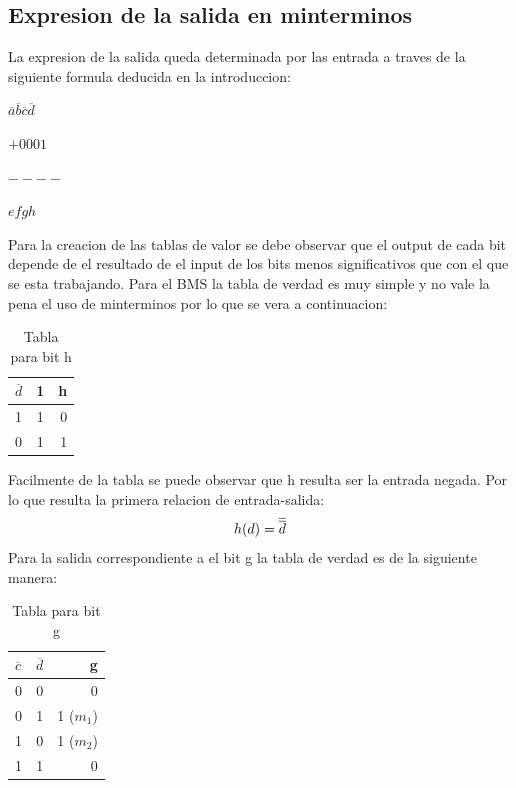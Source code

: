 \documentclass{article}
\begin{document}
	\subsection{Expresion de la salida en minterminos}
		\hspace{10mm} La expresion de la salida queda determinada por las entrada a traves de la siguiente formula deducida en la introduccion:
		\newline \centerline{$\overline{a} \overline{b} \overline{c} \overline{d}$}
		\newline \centerline{$+0001$}
		\newline \centerline{$----$}
		\newline \centerline{$efgh$}	
		\newline \hspace{10mm} Para la creacion de las tablas de valor se debe observar que el output de cada bit depende de el resultado de el input de los bits menos significativos que con el que se esta trabajando.
		\newline Para el BMS la tabla de verdad es muy simple y no vale la pena el uso de minterminos por lo que se vera a continuacion:
		\begin{table}[h!]
			\begin{center}
				\caption{Tabla para bit h}
				\begin{tabular}{l|c|r}
				\textbf{$\overline{d}$} & \textbf{1} & \textbf{h}\\
				\hline
				1 & 1 & 0 \\
				0 & 1 & 1 \\			
				\end{tabular}
			\end{center}
		\end{table}
		\newline Facilmente de la tabla se puede observar que h resulta ser la entrada negada. Por lo que resulta la primera relacion de entrada-salida:
		\begin{equation}
			\centerline{$h(d)=\overline{\overline{d}}$}
		\end{equation}
		\newline Para la salida correspondiente a el bit g la tabla de verdad es de la siguiente manera:
		\begin{table}[h!]
			\begin{center}
				\caption{Tabla para bit g}
				\begin{tabular}{l|c|r}
				\textbf{$\overline{c}$} & \textbf{$\overline{d}$} & \textbf{g}\\
				\hline
				0 & 0 & 0 \\
				0 & 1 & 1 ($m_{1}$) \\	
				1 & 0 & 1 ($m_{2}$)\\
				1 & 1 & 0 \\			
				\end{tabular}
			\end{center}
		\end{table}	
\end{document}
